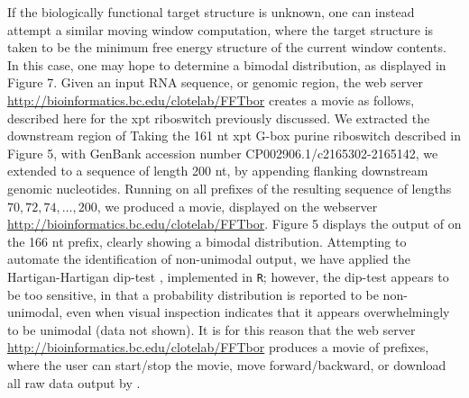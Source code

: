 If the biologically functional target structure is unknown, one can
instead attempt a similar moving window computation, where the target
structure is taken to be the minimum free energy structure of the
current window contents. In this case, one may hope to determine a
bimodal distribution, as displayed in Figure 7.
Given an input RNA sequence, or genomic region, the
web server \url{http://bioinformatics.bc.edu/clotelab/FFTbor}
creates a movie as follows, described here for the xpt riboswitch
previously discussed.  We extracted the downstream region of
Taking the
161 nt xpt G-box purine riboswitch described in Figure 5,
with GenBank accession number CP002906.1/c2165302-2165142, we extended
to a sequence of length 200 nt, by appending flanking
downstream genomic nucleotides.  Running \fftbor on all
prefixes of the resulting sequence of lengths
$70,72,74,\ldots,200$, we produced a movie, displayed on the webserver
\url{http://bioinformatics.bc.edu/clotelab/FFTbor}.
Figure 5 displays the output of \fftbor on the
166 nt prefix, clearly showing a bimodal distribution. Attempting to
automate the identification of non-unimodal \fftbor output, we have
applied the Hartigan-Hartigan dip-test \cite{hartiganDipTest},
implemented in {\tt R}; however,
the dip-test appears to be too sensitive, in that a probability distribution
is reported to be non-unimodal, even when visual inspection indicates that
it appears overwhelmingly to be unimodal (data not shown). It is for this
reason that the web server
\url{http://bioinformatics.bc.edu/clotelab/FFTbor} produces a movie of
prefixes, where the user can start/stop the movie,
move forward/backward, or download all raw data output by \fftbor.


